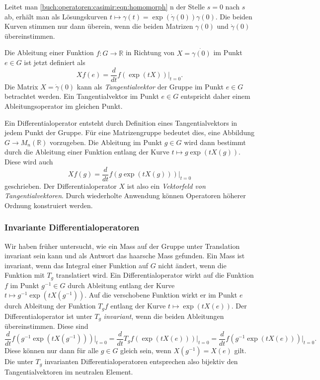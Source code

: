 Leitet man
\eqref{buch:operatoren:casimir:eqn:homomorph}
n der Stelle $s=0$ nach $s$ ab, erhält man als Lösungskurven
\(
t\mapsto \gamma(t) = \exp(\dot{\gamma}(0)) \gamma(0).
\)
Die beiden Kurven stimmen nur dann überein, wenn die beiden Matrizen
$\gamma(0)$ und $\dot{\gamma}(0)$ übereinstimmen.

Die Ableitung einer Funktion $f\colon G\to\mathbb{R}$ in Richtung von
$X=\dot{\gamma(0)}$ im Punkt $e\in G$ ist jetzt definiert als
\[
Xf(e)
=
\frac{d}{dt} f(\exp(tX)) \bigg|_{t=0}.
\]
Die Matrix $X=\dot{\gamma}(0)$ kann als {\em Tangentialvektor} der Gruppe
%
im Punkt $e\in G$ betrachtet werden.
Ein Tangentialvektor im Punkt $e\in G$ entspricht daher einem
Ableitungsoperator im gleichen Punkt.
%

Ein Differentialoperator entsteht durch Definition eines Tangentialvektors
in jedem Punkt der Gruppe.
Für eine Matrizengruppe bedeutet dies, eine Abbildung $G\to M_n(\mathbb{R})$ 
vorzugeben.
Die Ableitung im Punkt $g\in G$ wird dann bestimmt durch die
Ableitung einer Funktion entlang der Kurve $t\mapsto g\exp(tX(g))$.
Diese wird auch
\[
Xf(g)
=
\frac{d}{dt}f(g\exp(tX(g)))\bigg|_{t=0}
\]
geschrieben.
Der Differentialoperator $X$ ist also ein {\em Vektorfeld von
Tangentialvektoren}.
%
Durch wiederholte Anwendung können Operatoren höherer Ordnung konstruiert
werden.

%
%
\subsubsection{Invariante Differentialoperatoren}
Wir haben früher untersucht, wie ein Mass auf der Gruppe unter Translation
invariant sein kann und als Antwort das haarsche Mass gefunden.
Ein Mass ist invariant, wenn das Integral einer Funktion auf $G$ nicht
ändert, wenn die Funktion mit $T_g$ translatiert wird.
Ein Differentialoperator wirkt auf die Funktion $f$ im Punkt $g^{-1}\in G$
durch Ableitung entlang der Kurve $t\mapsto g^{-1}\exp(tX(g^{-1}))$.
Auf die verschobene Funktion wirkt er im Punkt $e$ durch Ableitung
der Funktion $T_gf$ entlang der Kurve $t\mapsto \exp(tX(e))$.
Der Differentialoperator ist unter $T_g$ {\em invariant}, wenn die beiden
Ableitungen übereinstimmen.
Diese sind
\[
\frac{d}{dt} f(g^{-1}\exp(tX(g^{-1}))) \bigg|_{t=0}
=
\frac{d}{dt} T_gf(\exp(tX(e)))\bigg|_{t=0}
=
\frac{d}{dt} f(g^{-1}\exp(tX(e)))\bigg|_{t=0}.
\]
Diese können nur dann für alle $g\in G$ gleich sein, wenn
$X(g^{-1}) = X(e)$ gilt.
Die unter $T_g$ invarianten Differentialoperatoren entsprechen also
bijektiv den Tangentialvektoren im neutralen Element.

